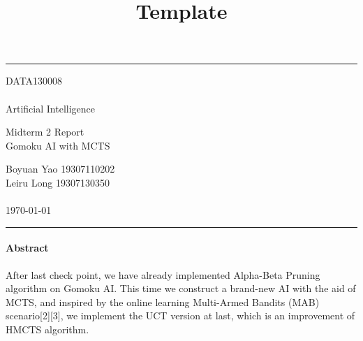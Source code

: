 \documentclass[a4paper, 11pt]{article} %
\begin{document}
	
	
	\title{Template} %
	\fancyhead[C]{}
	\hrule \medskip %
	\begin{minipage}{0.295\textwidth} %
		\raggedright
		DATA130008\\ %
		\footnotesize %
		\hfill\\
		Artificial Intelligence\\ %
	\end{minipage}
	\begin{minipage}{0.4\textwidth} %
		\centering
		\large %
		Midterm 2 Report\\ %
		\normalsize %
		Gomoku AI with MCTS\\ %
	\end{minipage}
	\begin{minipage}{0.295\textwidth} %
		\raggedleft
		Boyuan Yao 19307110202\\ %
		Leiru Long 19307130350\\
		\footnotesize %
		\hfill\\
		\today\\ %
	\end{minipage}
	\medskip\hrule %
	\bigskip
	
	\paragraph{Abstract}
	
	After last check point, we have already implemented Alpha-Beta Pruning algorithm on Gomoku AI. This time we construct a brand-new AI with the aid of MCTS, and inspired by the online learning Multi-Armed Bandits (MAB) scenario[2][3], we implement the UCT version at last, which is an improvement of HMCTS algorithm.
	
\end{document}
